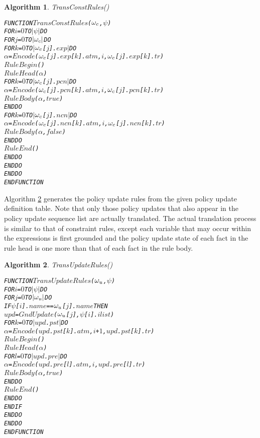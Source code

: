 \documentclass[11pt]{report}
\newenvironment{vverbatim}
{
  \begin{alltt}
}
{
    \vspace{-\baselineskip}
  \end{alltt}
}
\newtheorem{vvalgorithm}{Algorithm}[chapter]
\newenvironment{valgorithm}[2]
{
  \begin{vvalgorithm}{#1}
    \label{#2}
    \small
    \begin{vverbatim}
}
{
    \end{vverbatim}
  \end{vvalgorithm}
}
\begin{document}
          \begin{valgorithm}{TransConstRules()}{algo-polup-tconr}
FUNCTION \(TransConstRules\)(\(\omega\sb{c}\), \(\psi\))
  FOR \(i\) = \(0\) TO \(|\psi|\) DO
    FOR \(j\) = \(0\) TO \(|\omega\sb{c}|\) DO
      FOR \(k\) = \(0\) TO \(|\)\(\omega\sb{c}\)[\(j\)].\(exp\)\(|\) DO
        \(\alpha\) = \(Encode\)(\(\omega\sb{c}\)[\(j\)].\(exp\)[\(k\)].\(atm\), \(i\), \(\omega\sb{c}\)[\(j\)].\(exp\)[\(k\)].\(tr\))
        \(RuleBegin\)()
        \(RuleHead\)(\(\alpha\))
        FOR \(k\) = \(0\) TO \(|\)\(\omega\sb{c}\)[\(j\)].\(pcn\)\(|\) DO
          \(\alpha\) = \(Encode\)(\(\omega\sb{c}\)[\(j\)].\(pcn\)[\(k\)].\(atm\), \(i\), \(\omega\sb{c}\)[\(j\)].\(pcn\)[\(k\)].\(tr\))
          \(RuleBody\)(\(\alpha\), \(true\))
        ENDDO
        FOR \(k\) = \(0\) TO \(|\)\(\omega\sb{c}\)[\(j\)].\(ncn\)\(|\) DO
          \(\alpha\) = \(Encode\)(\(\omega\sb{c}\)[\(j\)].\(ncn\)[\(k\)].\(atm\), \(i\), \(\omega\sb{c}\)[\(j\)].\(ncn\)[\(k\)].\(tr\))
          \(RuleBody\)(\(\alpha\), \(false\))
        ENDDO
        \(RuleEnd\)()
      ENDDO
    ENDDO
  ENDDO
ENDFUNCTION
          \end{valgorithm}

          Algorithm \ref{algo-polup-tupdr} generates the policy update rules
          from the given policy update definition table. Note that only those
          policy updates that also appear in the policy update sequence list
          are actually translated. The actual translation process is similar
          to that of constraint rules, except each variable that may occur
          within the expressions is first grounded and the policy update state
          of each fact in the rule head is one more than that of each fact in
          the rule body.

          \begin{valgorithm}{TransUpdateRules()}{algo-polup-tupdr}
FUNCTION \(TransUpdateRules\)(\(\omega\sb{u}\), \(\psi\))
  FOR \(i\) = \(0\) TO \(|\psi|\) DO
    FOR \(j\) = \(0\) TO \(|\omega\sb{u}|\) DO
      IF \(\psi\)[\(i\)].\(name\) == \(\omega\sb{u}\)[\(j\)].\(name\) THEN
        \(upd\) = \(GndUpdate\)(\(\omega\sb{u}\)[\(j\)], \(\psi\)[\(i\)].\(ilist\))
        FOR \(k\) = \(0\) TO \(|\)\(upd\).\(pst\)\(|\) DO
          \(\alpha\) = \(Encode\)(\(upd\).\(pst\)[\(k\)].\(atm\), \(i\) + \(1\), \(upd\).\(pst\)[\(k\)].\(tr\))
          \(RuleBegin\)()
          \(RuleHead\)(\(\alpha\))
          FOR \(l\) = \(0\) TO \(|\)\(upd\).\(pre\)\(|\) DO
            \(\alpha\) = \(Encode\)(\(upd\).\(pre\)[\(l\)].\(atm\), \(i\), \(upd\).\(pre\)[\(l\)].\(tr\))
            \(RuleBody\)(\(\alpha\), \(true\))
          ENDDO
          \(RuleEnd\)()
        ENDDO
      ENDIF
    ENDDO
  ENDDO
ENDFUNCTION
          \end{valgorithm}
\end{document}

